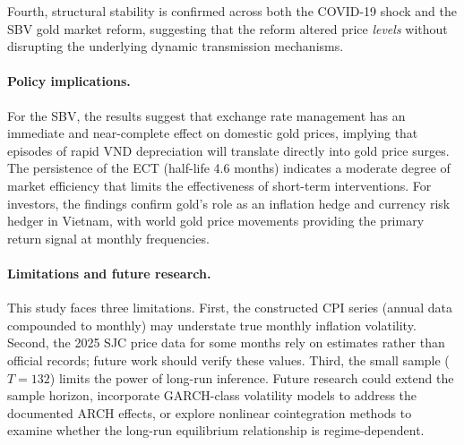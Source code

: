 \documentclass[12pt,a4paper]{article}
\begin{document}
Fourth, structural stability is confirmed across both the COVID-19 shock
and the SBV gold market reform, suggesting that the reform altered price
\textit{levels} without disrupting the underlying dynamic transmission
mechanisms.

\paragraph{Policy implications.}
For the SBV, the results suggest that exchange rate management
has an immediate and near-complete effect on domestic gold prices,
implying that episodes of rapid VND depreciation will translate directly
into gold price surges. The persistence of the ECT (half-life 4.6 months)
indicates a moderate degree of market efficiency that limits the effectiveness
of short-term interventions.
For investors, the findings confirm gold's role as an inflation hedge and
currency risk hedger in Vietnam, with world gold price movements providing
the primary return signal at monthly frequencies.

\paragraph{Limitations and future research.}
This study faces three limitations.
First, the constructed CPI series (annual data compounded to monthly) may
understate true monthly inflation volatility.
Second, the 2025 SJC price data for some months rely on estimates rather
than official records; future work should verify these values.
Third, the small sample ($T = 132$) limits the power of long-run inference.
Future research could extend the sample horizon, incorporate GARCH-class
volatility models to address the documented ARCH effects, or explore
nonlinear cointegration methods to examine whether the long-run equilibrium
relationship is regime-dependent.
\end{document}
